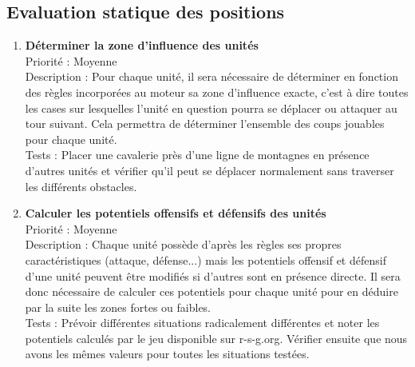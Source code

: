 		\subsection{Evaluation statique des positions}

			\begin{enumerate}

				\item \textbf{Déterminer la zone d'influence des unités} 
				\\[0.7\baselineskip]
				Priorité : Moyenne 
				\\[0.7\baselineskip]
				Description : Pour chaque unité, il sera nécessaire de déterminer en fonction des règles incorporées au moteur sa zone d'influence exacte, 
				c'est à dire toutes les cases sur lesquelles l'unité en question pourra se déplacer ou attaquer au tour suivant. Cela permettra de déterminer 
				l'ensemble des coups jouables pour chaque unité. 
				\\[0.7\baselineskip]
				Tests : Placer une cavalerie près d'une ligne de montagnes en présence d'autres unités et vérifier qu'il peut se déplacer normalement sans traverser 
				les différents obstacles. 
				\\[0.7\baselineskip]

				\item \textbf{Calculer les potentiels offensifs et défensifs des unités} 
				\\[0.7\baselineskip]
				Priorité : Moyenne 
				\\[0.7\baselineskip]
				Description : Chaque unité possède d'après les règles ses propres caractéristiques (attaque, défense...) mais les potentiels offensif et défensif 
				d'une unité peuvent être modifiés si d'autres sont en présence directe. Il sera donc nécessaire de calculer ces potentiels pour chaque unité pour en déduire 
				par la suite les zones fortes ou faibles. 
				\\[0.7\baselineskip]
				Tests : Prévoir différentes situations radicalement différentes et noter les potentiels calculés par le jeu disponible sur r-s-g.org. Vérifier ensuite 
				que nous avons les mêmes valeurs pour toutes les situations testées. 
				\\[0.7\baselineskip]


\end{enumerate}
